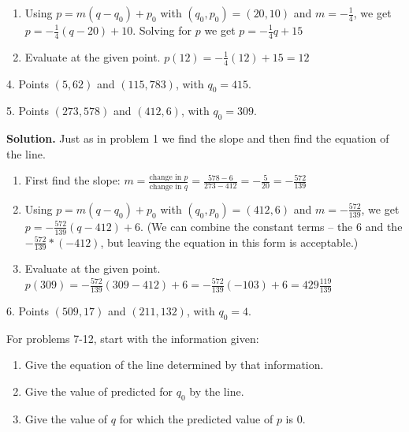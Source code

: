 \documentclass[10pt,]{book}
\theoremstyle{plain}
\theoremstyle{definition}
\theoremstyle{definition}
\begin{document}
\begin{exerciselist}
\begin{enumerate}[label=(\alph*)]
=  =-=-\)%
\item\hypertarget{li-32}{}Using \(p=m (q-q_0)+p_0\) with \((q_0,p_0 )=(20, 10)\) and \(m = -\frac{1}{4}\), we get \(p=-\frac{1}{4}(q-20)+10\).  Solving for \(p\) we get \(p =-\frac{1}{4}q+15\)%
\item\hypertarget{li-33}{}Evaluate at the given point.  \(p(12)=-\frac{1}{4}(12)+15=12\)%
\end{enumerate}
\item[4.]\hypertarget{exercise-4}{} Points \((5,62)\) and \((115,783)\), with \(q_0=415\).
%
\par\smallskip
\item[5.]\hypertarget{exercise-5}{} Points \((273,578)\) and \((412,6)\), with \(q_0=309\).
%
\par\smallskip
\par\smallskip
\noindent\textbf{Solution.}\hypertarget{solution-3}{}\quad
Just as in problem 1 we find the slope and then find the equation of the line.%
\leavevmode%
\begin{enumerate}[label=(\alph*)]
\item\hypertarget{li-34}{}First find the slope: \(m=  \frac{\text{change in }p}{\text{change in }q}
=  \frac{578-6}{273-412}=-\frac{5}{20}=-\frac{572}{139}\)%
\item\hypertarget{li-35}{}Using \(p=m (q-q_0)+p_0\) with \((q_0,p_0 )=(412, 6)\) and \(m = -\frac{572}{139}\), we get \(p=-\frac{572}{139}(q-412)+6\).  (We can combine the constant terms – the \(6\) and the \(-\frac{572}{139}*(-412)\), but leaving the equation in this form is acceptable.)%
\item\hypertarget{li-36}{}Evaluate at the given point.  \(p(309)=-\frac{572}{139}(309-412)+6
=-\frac{572}{139}(-103)+6=429\frac{119}{139}\)%
\end{enumerate}
\item[6.]\hypertarget{exercise-6}{} Points \((509,17)\) and \((211,132)\), with \(q_0=4\).
%
\par\smallskip
\par
For problems 7-12, start with the information given:%
\leavevmode%
\begin{enumerate}[label=(\alph*)]
\item\hypertarget{li-37}{}Give the equation of the line determined by that information.%
\item\hypertarget{li-38}{}Give the value of predicted for \(q_0\) by the line.%
\item\hypertarget{li-39}{}Give the value of \(q\) for which the predicted value of \(p\) is \(0\).%

\end{enumerate}
\end{exerciselist}
\end{document}
